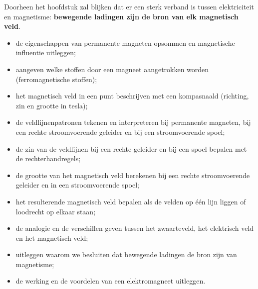 \documentclass{ximera}
\begin{document}
Doorheen het hoofdstuk zal blijken dat er een sterk verband is tussen elektriciteit en magnetisme: \textbf{bewegende ladingen zijn de bron van elk magnetisch veld}.

\begin{definition}[title={Wat je na dit hoofdstuk moet kennen en kunnen}]\nl
    \begin{itemize}
        \item de eigenschappen van permanente magneten opsommen en magnetische influentie uitleggen;
        \item aangeven welke stoffen door een magneet aangetrokken worden (ferromagnetische stoffen);
        \item het magnetisch veld in een punt beschrijven met een kompasnaald (richting, zin en grootte in tesla);
        \item de veldlijnenpatronen tekenen en interpreteren bij permanente magneten, bij een rechte stroomvoerende geleider en bij een stroomvoerende spoel;
        \item de zin van de veldlijnen bij een rechte geleider en bij een spoel bepalen met de rechterhandregels;
        \item de grootte van het magnetisch veld berekenen bij een rechte stroomvoerende geleider en in een stroomvoerende spoel;
        \item het resulterende magnetisch veld bepalen als de velden op één lijn liggen of loodrecht op elkaar staan;
        \item de analogie en de verschillen geven tussen het zwaarteveld, het elektrisch veld en het magnetisch veld;
        \item uitleggen waarom we besluiten dat bewegende ladingen de bron zijn van magnetisme;
        \item de werking en de voordelen van een elektromagneet uitleggen.
    \end{itemize}
\end{definition}
\end{document}
